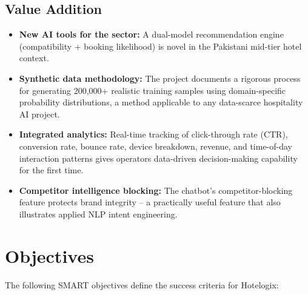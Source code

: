 \documentclass[12pt,a4paper]{report}
\begin{document}
\section{Value Addition}

\begin{itemize}[leftmargin=*, label=\textbullet]
  \item \textbf{New AI tools for the sector:} A dual-model recommendation engine (compatibility + booking likelihood) is novel in the Pakistani mid-tier hotel context.
  \item \textbf{Synthetic data methodology:} The project documents a rigorous process for generating 200,000+ realistic training samples using domain-specific probability distributions, a method applicable to any data-scarce hospitality AI project.
  \item \textbf{Integrated analytics:} Real-time tracking of click-through rate (CTR), conversion rate, bounce rate, device breakdown, revenue, and time-of-day interaction patterns gives operators data-driven decision-making capability for the first time.
  \item \textbf{Competitor intelligence blocking:} The chatbot's competitor-blocking feature protects brand integrity -- a practically useful feature that also illustrates applied NLP intent engineering.
\end{itemize}

\chapter{Objectives}

The following SMART objectives define the success criteria for Hotelogix:
\end{document}
